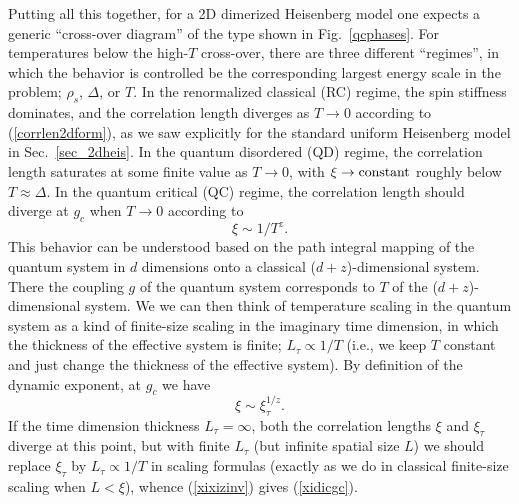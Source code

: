 \documentclass[draft,numberedheadings]{aipproc}
\begin{document}
Putting all this together, for a 2D dimerized Heisenberg model one expects a generic 
``cross-over diagram'' \cite{chn,chubukov}  of the type shown in Fig.~\ref{qcphases}. For temperatures below 
the high-$T$ cross-over, there are three different ``regimes'', in which the behavior is controlled be the corresponding largest energy scale in the problem; 
$\rho_s$, $\Delta$, or $T$. In the renormalized classical (RC) regime, the spin stiffness dominates, and the correlation length diverges as $T\to 0$ according 
to (\ref{corrlen2dform}), as we saw explicitly for the standard uniform Heisenberg model in Sec.~\ref{sec_2dheis}. In the quantum disordered (QD) regime, the 
correlation length saturates at some finite value as $T\to 0$, with $\xi\to{\rm constant}$ roughly below $T \approx \Delta$. In the quantum critical 
(QC) regime, the correlation length should diverge at $g_c$ when $T \to 0$ according to
\begin{equation}
\xi \sim 1/T^z.
\label{xidicgc}
\end{equation}
This behavior can be understood based on the path integral mapping of the quantum system in $d$ dimensions onto a classical ($d+z$)-dimensional system. 
There the coupling $g$ of the quantum system corresponds to $T$ of the ($d+z$)-dimensional system. We we can then think of temperature scaling in the quantum 
system as a kind of finite-size scaling in the imaginary time dimension, in which the thickness of the effective system is finite; $L_\tau \propto 1/T$ 
(i.e., we keep $T$ constant and just change the thickness of the effective system). By definition of the dynamic exponent, at $g_c$ we have
\begin{equation}
\xi \sim \xi_\tau^{1/z}.
\label{xixizinv}
\end{equation}
If the time dimension thickness $L_\tau=\infty$, both the correlation lengths $\xi$ and $\xi_\tau$ diverge at this point, but with finite $L_\tau$ (but 
infinite spatial size $L$) we should replace $\xi_\tau$ by $L_\tau \propto 1/T$ in scaling formulas (exactly as we do in classical finite-size scaling 
when $L < \xi$), whence (\ref{xixizinv}) gives (\ref{xidicgc}).
\end{document}
